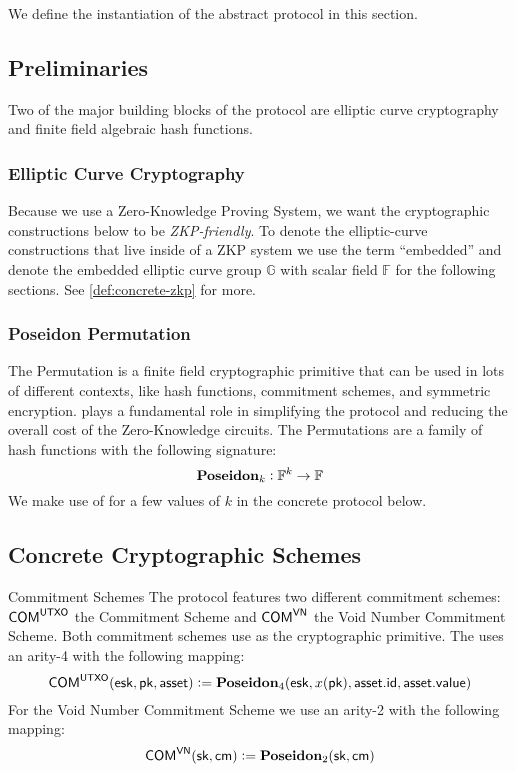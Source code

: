 
We define the instantiation of the abstract protocol in this section.

\subsection{Preliminaries}

Two of the major building blocks of the protocol are elliptic curve cryptography and finite field algebraic hash functions.

\subsubsection{Elliptic Curve Cryptography}

Because we use a Zero-Knowledge Proving System, we want the cryptographic constructions below to be \emph{ZKP-friendly}. To denote the elliptic-curve constructions that live inside of a ZKP system we use the term ``embedded'' and denote the embedded elliptic curve group $\mathbb{G}$ with scalar field $\mathbb{F}$ for the following sections. See \autoref{def:concrete-zkp} for more.

\subsubsection{Poseidon Permutation}

The \Poseidon{} Permutation \cite{KRRS21USENIX} is a finite field cryptographic primitive that can be used in lots of different contexts, like hash functions, commitment schemes, and symmetric encryption. \Poseidon{} plays a fundamental role in simplifying the protocol and reducing the overall cost of the Zero-Knowledge circuits. The \Poseidon{} Permutations are a family of hash functions with the following signature:
\[{\textbf{Poseidon}}_k : \mathbb{F}^k \to \mathbb{F}\]
We make use of \Poseidon{} for a few values of $k$ in the concrete protocol below.

\subsection{Concrete Cryptographic Schemes}

\begin{definitiontoc}{Commitment Schemes}
    The protocol features two different commitment schemes: ${\textsf{COM}}^{{\textsf{UTXO}}}$ the \UTXO{} Commitment Scheme and ${\textsf{COM}}^{{\textsf{VN}}}$ the Void Number Commitment Scheme. Both commitment schemes use \Poseidon{} as the cryptographic primitive. The \UTXO{} uses an arity-4 \Poseidon{} with the following mapping:
    \[{\textsf{COM}}^{{\textsf{UTXO}}}({\textsf{esk}}, {\textsf{pk}}, {\textsf{asset}}) := {\textbf{Poseidon}}_4({\textsf{esk}}, x({\textsf{pk}}), {\textsf{asset}}.{\textsf{id}}, {\textsf{asset}}.{\textsf{value}})\]
    For the Void Number Commitment Scheme we use an arity-2 \Poseidon{} with the following mapping:
    \[{\textsf{COM}}^{{\textsf{VN}}}({\textsf{sk}}, {\textsf{cm}}) := {\textbf{Poseidon}}_2({\textsf{sk}}, {\textsf{cm}})\]
\end{definitiontoc}

